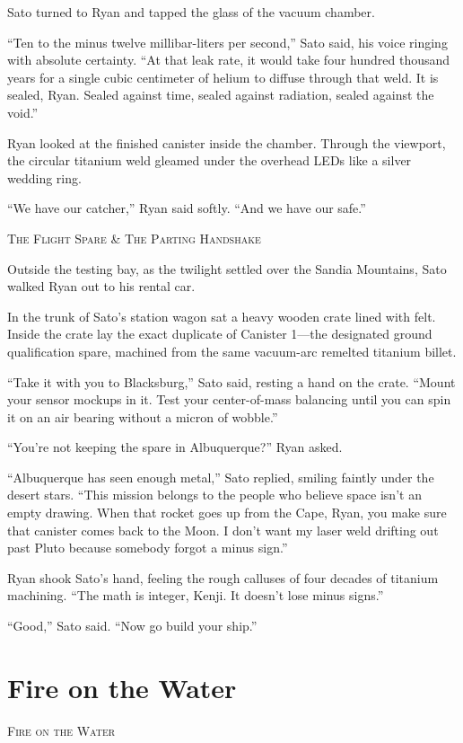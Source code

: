 \documentclass[12pt,twoside,openright]{book}
\newcommand{\sceneheader}[1]{%
  \par\vspace{1.8em}%
  {\noindent\centering\scshape\large #1\par}%
  \vspace{1.0em}%
  \noindent%
}
\newcommand{\dinkus}{%
  \par\vspace{1.2em}%
  {\noindent\centering{\large $\ast\quad\ast\quad\ast$}\par}%
  \vspace{1.2em}%
  \noindent%
}
\begin{document}
Sato turned to Ryan and tapped the glass of the vacuum chamber.

``Ten to the minus twelve millibar-liters per second,'' Sato said, his
voice ringing with absolute certainty. ``At that leak rate, it would
take four hundred thousand years for a single cubic centimeter of helium
to diffuse through that weld. It is sealed, Ryan. Sealed against time,
sealed against radiation, sealed against the void.''

Ryan looked at the finished canister inside the chamber. Through the
viewport, the circular titanium weld gleamed under the overhead LEDs
like a silver wedding ring.

``We have our catcher,'' Ryan said softly. ``And we have our safe.''

\dinkus

\sceneheader{The Flight Spare \& The Parting
Handshake}

Outside the testing bay, as the twilight settled over the Sandia
Mountains, Sato walked Ryan out to his rental car.

In the trunk of Sato's station wagon sat a heavy wooden crate lined with
felt. Inside the crate lay the exact duplicate of Canister 1---the
designated ground qualification spare, machined from the same vacuum-arc
remelted titanium billet.

``Take it with you to Blacksburg,'' Sato said, resting a hand on the
crate. ``Mount your sensor mockups in it. Test your center-of-mass
balancing until you can spin it on an air bearing without a micron of
wobble.''

``You're not keeping the spare in Albuquerque?'' Ryan asked.

``Albuquerque has seen enough metal,'' Sato replied, smiling faintly
under the desert stars. ``This mission belongs to the people who believe
space isn't an empty drawing. When that rocket goes up from the Cape,
Ryan, you make sure that canister comes back to the Moon. I don't want
my laser weld drifting out past Pluto because somebody forgot a minus
sign.''

Ryan shook Sato's hand, feeling the rough calluses of four decades of
titanium machining. ``The math is integer, Kenji. It doesn't lose minus
signs.''

``Good,'' Sato said. ``Now go build your ship.''

\chapter{Fire on the Water}
\sceneheader{Fire on the Water}
\end{document}
